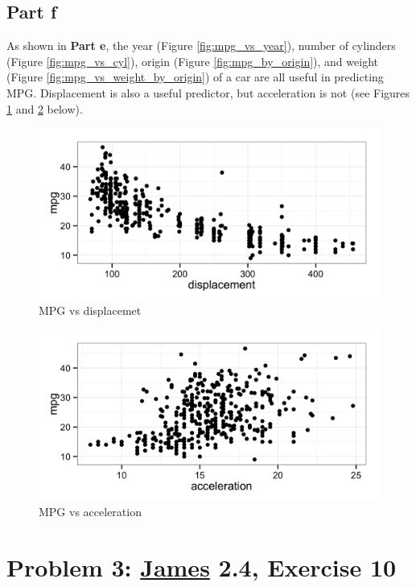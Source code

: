 \documentclass[11pt]{article}
\begin{document}
\subsection*{Part f}

As shown in \textbf{Part e}, the year (Figure \ref{fig:mpg_vs_year}), number of cylinders (Figure \ref{fig:mpg_vs_cyl}), origin (Figure \ref{fig:mpg_by_origin}), and weight (Figure \ref{fig:mpg_vs_weight_by_origin}) of a car are all useful in predicting MPG. Displacement is also a useful predictor, but acceleration is not (see Figures \ref{fig:mpg_by_disp} and \ref{fig:mpg_by_acc} below).

\begin{figure}[H]
	\centering
	\includegraphics[width=5in]{9e_mpg_vs_disp.png}
	\caption{MPG vs displacemet}
	\label{fig:mpg_by_disp}
\end{figure}

\begin{figure}[H]
	\centering
	\includegraphics[width=5in]{9e_mpg_vs_acc.png}
	\caption{MPG vs acceleration}
	\label{fig:mpg_by_acc}
\end{figure}



\section*{Problem 3: \href{http://www-bcf.usc.edu/~gareth/ISL/}{James} 2.4, Exercise 10}
\end{document}
